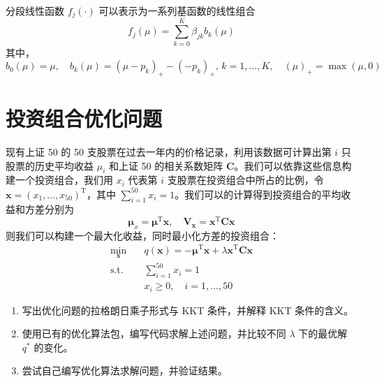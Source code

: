 \documentclass[cn,12pt,mtpro2]{elegantpaper}
\begin{document}
\begin{note}
    分段线性函数 $f_{j}(\cdot)$ 可以表示为一系列基函数的线性组合
    \begin{equation}
        f_{j}(\mu)=\sum_{k=0}^{K}\beta_{jk}b_{k}(\mu)
    \end{equation}
    其中，
    \begin{equation}
        b_{0}(\mu)=\mu,\quad b_{k}(\mu)=(\mu-p_{k})_{+}-(-p_{k})_{+},\,k=1,\ldots,K,\quad(\mu)_{+}=\max(\mu,0)
    \end{equation}
\end{note}

\section{投资组合优化问题}

现有上证 50 的 50 支股票在过去一年内的价格记录，利用该数据可计算出第 $i$ 只股票的历史平均收益 $\mu_{i}$ 和上证 50 的相关系数矩阵 $\mathbf{C}$。我们可以依靠这些信息构建一个投资组合，我们用 $x_{i}$ 代表第 $i$ 支股票在投资组合中所占的比例，令 $\mathbf{x}=
    \left(x_{1},\ldots,x_{50}\right)^{\mathrm{T}}$，其中 $\sum_{i=1}^{50}x_{i}=1$。我们可以的计算得到投资组合的平均收益和方差分别为
\begin{equation}
    \mathbf{\mu}_{x}=\mathbf{\mu}^{\mathrm{T}}\mathbf{x},\quad\mathbf{V}_{\mathbf{x}}=\mathbf{x}^{\mathrm{T}}\mathbf{C}\mathbf{x}
\end{equation}
则我们可以构建一个最大化收益，同时最小化方差的投资组合：
\begin{equation}
    \begin{aligned}
        \min_{\mathbf{x}}\quad & q(\mathbf{x})=-\mathbf{\mu}^{\mathrm{T}}\mathbf{x}+\lambda\mathbf{x}^{\mathrm{T}}\mathbf{C}\mathbf{x} \\
        \textrm{s.t.}\quad     & \sum_{i=1}^{50}x_i=1                                                                                  \\
                               & x_{i}\geq 0,\quad i=1,\ldots,50
    \end{aligned}
\end{equation}
\begin{enumerate}
    \item 写出优化问题的拉格朗日乘子形式与 KKT 条件，并解释 KKT 条件的含义。
    \item 使用已有的优化算法包，编写代码求解上述问题，并比较不同 $\lambda$ 下的最优解 $q^{*}$ 的变化。
    \item 尝试自己编写优化算法求解问题，并验证结果。
\end{enumerate}
\end{document}
